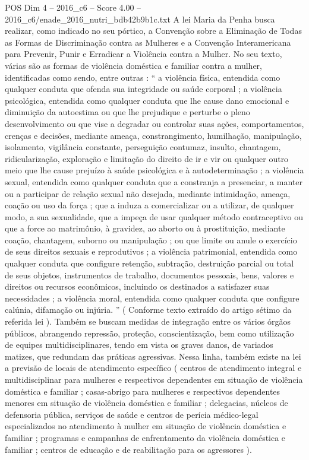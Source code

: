 \begin{textsample}{POS Dim 4 – 2016\_c6 – Score 4.00 – 2016\_c6/enade\_2016\_nutri\_bdb42b9b1c.txt}
A lei Maria da Penha busca realizar, como indicado no seu pórtico, a Convenção sobre a Eliminação de Todas as Formas de Discriminação contra as Mulheres e a Convenção Interamericana para Prevenir, Punir e Erradicar a Violência contra a Mulher.
No seu texto, várias são as formas de violência doméstica e familiar contra a mulher, identificadas como sendo, entre outras : “ a violência física, entendida como qualquer conduta que ofenda sua integridade ou saúde corporal ; a violência psicológica, entendida como qualquer conduta que lhe cause dano emocional e diminuição da autoestima ou que lhe prejudique e perturbe o pleno desenvolvimento ou que vise a degradar ou controlar suas ações, comportamentos, crenças e decisões, mediante ameaça, constrangimento, humilhação, manipulação, isolamento, vigilância constante, perseguição contumaz, insulto, chantagem, ridicularização, exploração e limitação do direito de ir e vir ou qualquer outro meio que lhe cause prejuízo à saúde psicológica e à autodeterminação ; a violência sexual, entendida como qualquer conduta que a constranja a presenciar, a manter ou a participar de relação sexual não desejada, mediante intimidação, ameaça, coação ou uso da força ; que a induza a comercializar ou a utilizar, de qualquer modo, a sua sexualidade, que a impeça de usar qualquer método contraceptivo ou que a force ao matrimônio, à gravidez, ao aborto ou à prostituição, mediante coação, chantagem, suborno ou manipulação ; ou que limite ou anule o exercício de seus direitos sexuais e reprodutivos ; a violência patrimonial, entendida como qualquer conduta que configure retenção, subtração, destruição parcial ou total de seus objetos, instrumentos de trabalho, documentos pessoais, bens, valores e direitos ou recursos econômicos, incluindo os destinados a satisfazer suas necessidades ; a violência moral, entendida como qualquer conduta que configure calúnia, difamação ou injúria. ” ( Conforme texto extraído do artigo sétimo da referida lei ).
Também se buscam medidas de integração entre os vários órgãos públicos, abrangendo repressão, proteção, conscientização, bem como utilização de equipes multidisciplinares, tendo em vista os graves danos, de variados matizes, que redundam das práticas agressivas.
Nessa linha, também existe na lei a previsão de locais de atendimento específico ( centros de atendimento integral e multidisciplinar para mulheres e respectivos dependentes em situação de violência doméstica e familiar ; casas-abrigo para mulheres e respectivos dependentes menores em situação de violência doméstica e familiar ; delegacias, núcleos de defensoria pública, serviços de saúde e centros de perícia médico-legal especializados no atendimento à mulher em situação de violência doméstica e familiar ; programas e campanhas de enfrentamento da violência doméstica e familiar ; centros de educação e de reabilitação para os agressores ).

\end{textsample}
